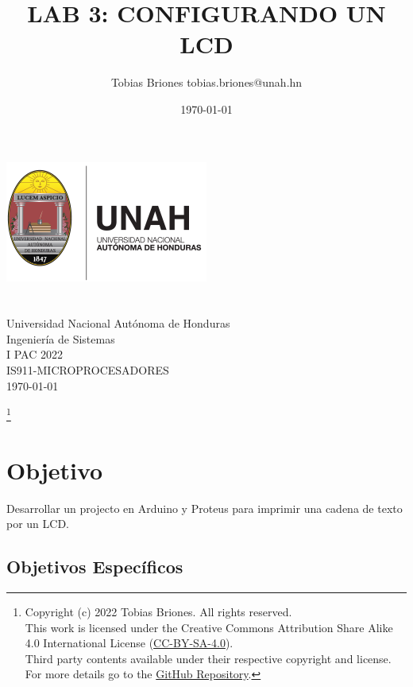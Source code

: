 \documentclass{article}
\title{LAB 3: CONFIGURANDO UN LCD}
\author{Tobias Briones \bigbreak tobias.briones@unah.hn}
\date{\today}
\newcommand\blfootnote[1]{
    \begingroup
    \renewcommand\thefootnote{}\footnote{#1}
    \addtocounter{footnote}{-1}
    \endgroup
}
\begin{document}
    \makeatletter
    \begin{titlepage}
        \begin{center}
            \includegraphics[width=0.3\linewidth]{images/logo-unah.png}\\[4ex]
            {\huge \bfseries \@title
            \vspace{1cm}}\\[2ex]
            {\LARGE \@author}\\[50ex]

            {\large
            Universidad Nacional Autónoma de Honduras\\
            Ingeniería de Sistemas\\
            I PAC 2022\\
            IS911-MICROPROCESADORES
            }\\[2ex]

            {\large \today}
        \end{center}
    \end{titlepage}
    \makeatother
    \thispagestyle{empty}
    \newpage

    \blfootnote{
        Copyright (c) 2022 Tobias Briones. All rights reserved. \\
        This work is licensed under the Creative Commons Attribution Share
        Alike 4.0 International License (\href{https://spdx
.org/licenses/CC-BY-SA-4.0}{CC-BY-SA-4.0}). \\
        Third party contents available under their respective copyright and
        license.\\
        For more details go to the \href{https://github
.com/tobiasbriones/cp-unah-is911-microprocessors}{GitHub Repository}.}

    \section{Objetivo}

    Desarrollar un projecto en Arduino y Proteus para imprimir una cadena de
    texto por un LCD.

    \subsection{Objetivos Específicos}
\end{document}
